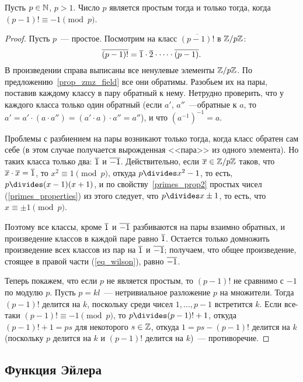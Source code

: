 \begin{theorem}[Вильсона]
Пусть $p\in\mathbb N$, $p>1$. Число $p$ является простым тогда и только
тогда, когда $(p-1)!\equiv -1\pmod p$.
\end{theorem}
\begin{proof}
Пусть $p$~--- простое.
Посмотрим на класс $\overline{(p-1)!}$ в $\mathbb Z/p\mathbb Z$:
\begin{equation}\label{eq_wilson}
\overline{(p-1)!}=\overline{1}\cdot\overline{2}\cdot\cdots\cdot\overline{(p-1)}.
\end{equation}
В произведении справа выписаны все ненулевые элементы $\mathbb Z/p\mathbb
Z$. По предложению~\ref{prop_zmz_field} все они обратимы. Разобьем их
на пары, поставив каждому классу в пару обратный к нему. Нетрудно
проверить, что у каждого класса только один обратный (если $a'$,
$a''$~---обратные к $a$, то $a'=a'\cdot (a\cdot a'')=(a'\cdot a)\cdot
a''=a''$), и что $(a^{-1})^{-1}=a$.

Проблемы с разбиением на пары
возникают только тогда, когда класс обратен сам себе (в этом случае
получается вырожденная <<пара>> из одного элемента). Но таких класса
только два: $\overline{1}$ и $\overline{-1}$. Действительно, если $\overline{x}\in\mathbb Z/p\mathbb
Z$ таков, что $\overline{x}\cdot\overline{x}=\overline{1}$, то $x^2\equiv 1\pmod p$,
откуда $p\divides x^2-1$, то есть, $p\divides (x-1)(x+1)$, и по
свойству~\ref{primes_prop2} простых чисел (\ref{primes_properties}) из
этого следует, что $p\divides x\pm 1$, то есть, что $x\equiv \pm 1\pmod
p$.

Поэтому все классы, кроме $\overline{1}$ и $\overline{-1}$ разбиваются на пары
взаимно обратных, и произведение классов в каждой паре равно
$\overline{1}$. Остается только домножить произведение всех классов из пар
на $\overline{1}$ и $\overline{-1}$; получаем, что общее произведение, стоящее в
правой части (\ref{eq_wilson}), равно $\overline{-1}$.

Теперь покажем, что если $p$ не является простым, то $(p-1)!$ не
сравнимо с $-1$ по модулю $p$. Пусть $p=kl$~--- нетривиальное
разложение $p$ на множители. Тогда $(p-1)!$ делится на $k$, поскольку
среди чисел $1,\dots,p-1$ встретится $k$. Если все-таки $(p-1)!\equiv
-1\pmod p$, то $p\divides (p-1)!+1$, откуда $(p-1)!+1=ps$ для некоторого
$s\in\mathbb Z$, откуда $1=ps-(p-1)!$ делится на $k$ (поскольку $p$
делится на $k$ и $(p-1)!$ делится на $k$)~--- противоречие.
\end{proof}

\subsection{Функция Эйлера}

